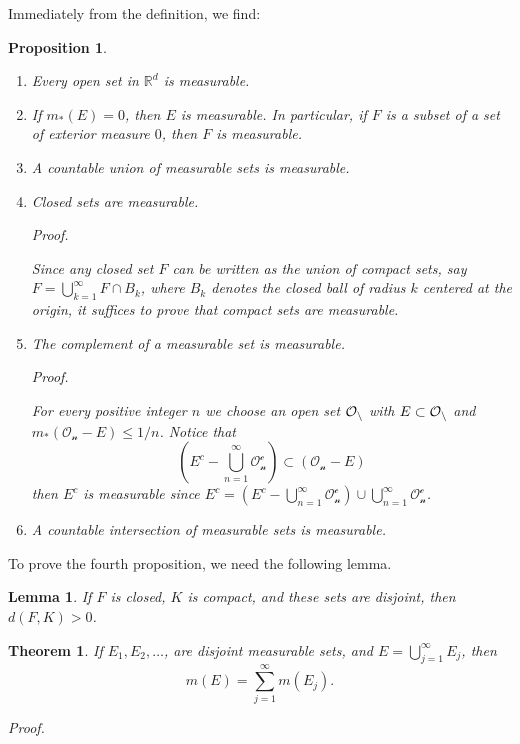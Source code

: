 \documentclass[
]{book}
\providecommand{\tightlist}{%
  \setlength{\itemsep}{0pt}\setlength{\parskip}{0pt}}
\newtheorem{theorem}{Theorem}[chapter]
\newtheorem{lemma}{Lemma}[chapter]
\newtheorem{proposition}{Proposition}[chapter]
\theoremstyle{definition}
\theoremstyle{definition}
\theoremstyle{definition}
\theoremstyle{definition}
\theoremstyle{remark}
\begin{document}
Immediately from the definition, we find:

\begin{proposition}
\leavevmode

\begin{enumerate}
\def\labelenumi{\arabic{enumi}.}
\tightlist
\item
  Every open set in \(\mathbb{R}^d\) is measurable.
\item
  If \(m_{\ast}(E)=0\), then \(E\) is measurable. In particular, if \(F\) is a subset of a set of exterior measure \(0\), then \(F\) is measurable.
\item
  A countable union of measurable sets is measurable.
\item
  Closed sets are measurable.

  \emph{Proof.}

  Since any closed set \(F\) can be written as the union of compact sets, say \(F=\bigcup_{k=1}^{\infty}F\cap B_k\), where \(B_k\) denotes the closed ball of radius \(k\) centered at the origin, it suffices to prove that compact sets are measurable.
\item
  The complement of a measurable set is measurable.

  \emph{Proof.}

  For every positive integer \(n\) we choose an open set \(\cal O_n\) with \(E\subset \cal O_n\) and \(m_{\ast}(\mathcal{O_n}-E)\leq 1/n\). Notice that
  \[
    (E^c-\bigcup_{n=1}^{\infty}\mathcal{O_n^c}) \subset(\mathcal{O_n}-E)
    \]
  then \(E^c\) is measurable since \(E^c=(E^c-\bigcup_{n=1}^{\infty}\mathcal{O_n^c})\cup \bigcup_{n=1}^{\infty}\mathcal{O_n^c}\).
\item
  A countable intersection of measurable sets is measurable.
\end{enumerate}

\end{proposition}

To prove the fourth proposition, we need the following lemma.

\begin{lemma}
If \(F\) is closed, \(K\) is compact, and these sets are disjoint, then \(d(F,K)>0\).
\end{lemma}

\begin{theorem}
If \(E_1,E_2,\dots\), are disjoint measurable sets, and \(E=\bigcup_{j=1}^{\infty}E_j\), then
\[
m(E)=\sum_{j=1}^{\infty}m(E_j).
\]
\end{theorem}

\emph{Proof.}
\end{document}
